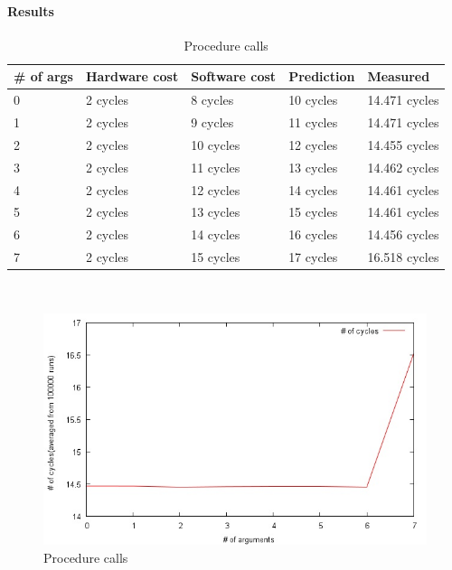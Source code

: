 \paragraph{Results}
\begin{table}[h]

\begin{center}
\begin{tabular}{| l | l | l | l | l |}
\hline
\# of args 	& Hardware cost 	& Software cost & Prediction & Measured \\ \hline
0 & 2 cycles 	& 8 cycles  		& 10 cycles 	& 14.471 cycles \\ \hline
1 & 2 cycles 	& 9 cycles  		& 11 cycles 	& 14.471 cycles \\ \hline
2 & 2 cycles 	& 10 cycles  		& 12 cycles 	& 14.455 cycles \\ \hline
3 & 2 cycles 	& 11 cycles 		& 13 cycles 	& 14.462 cycles \\ \hline
4 & 2 cycles 	& 12 cycles 		& 14 cycles 	& 14.461 cycles \\ \hline
5 & 2 cycles 	& 13 cycles 		& 15 cycles 	& 14.461 cycles \\ \hline
6 & 2 cycles 	& 14 cycles 		& 16 cycles 	& 14.456 cycles \\ \hline
7 & 2 cycles 	& 15 cycles 		& 17 cycles 	& 16.518 cycles \\ \hline
\end{tabular} \\
\end{center}
\caption{Procedure calls\label{tab:procCall}}
\end{table}
\begin{figure}[h]

\begin{center}
\includegraphics[scale=0.8]{procCallImage}
\end{center}
\caption{Procedure calls\label{fig:procCallf}}
\end{figure}




